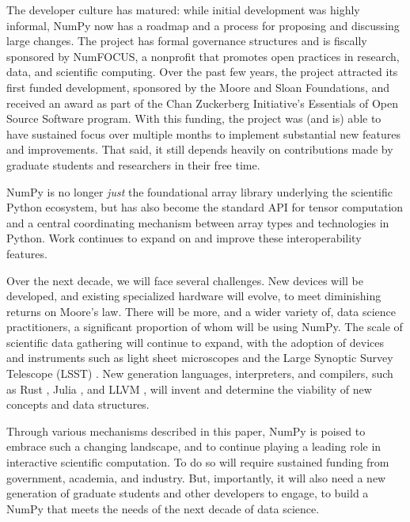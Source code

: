 \documentclass[twocolumn]{article}
\begin{document}
The developer culture has matured: while initial development was
highly informal, NumPy now has a roadmap and a process for proposing
and discussing large changes.  The project has formal governance
structures and is fiscally sponsored by NumFOCUS, a nonprofit that
promotes open practices in research, data, and scientific computing.
Over the past few years, the project attracted its first funded
development, sponsored by the Moore and Sloan Foundations, and
received an award as part of the Chan Zuckerberg Initiative's
Essentials of Open Source Software program.  With this funding, the
project was (and is) able to have sustained focus over multiple months
to implement substantial new features and improvements.  That said, it
still depends heavily on contributions made by graduate students and
researchers in their free time.

NumPy is no longer \emph{just} the foundational array library underlying
the scientific Python ecosystem, but has also become the standard API
for tensor computation and a central coordinating mechanism between
array types and technologies in Python. Work continues to expand on and
improve these interoperability features.

Over the next decade, we will face several challenges.  New devices will be
developed, and existing specialized hardware will evolve, to meet diminishing
returns on Moore's law.  There will be more, and a wider variety of, data
science practitioners, a significant proportion of whom will be using NumPy.
The scale of scientific data gathering will continue to expand, with the
adoption of devices and instruments such as light sheet microscopes and the
Large Synoptic Survey Telescope (LSST) \cite{jenness2018lsst}.  New generation
languages, interpreters, and compilers, such as Rust
\cite{10.1145/2692956.2663188}, Julia \cite{Julia-2017}, and LLVM
\cite{LLVM:CGO04}, will invent and determine the viability of new concepts and
data structures.

Through various mechanisms described in this paper, NumPy is poised to
embrace such a changing landscape, and to continue playing a leading
role in interactive scientific computation.  To do so will require
sustained funding from government, academia, and industry.  But,
importantly, it will also need a new generation of graduate students
and other developers to engage, to build a NumPy that meets the needs
of the next decade of data science.
 
\end{document}
